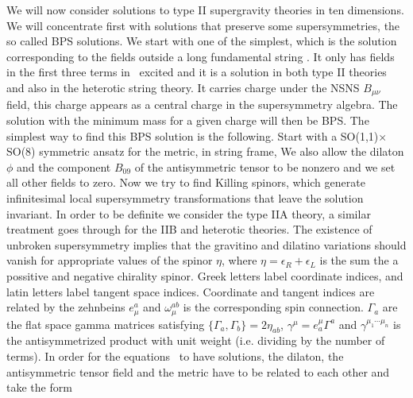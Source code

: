 We will now consider solutions to type II  supergravity 
theories in ten dimensions. We will concentrate first with 
solutions that preserve some supersymmetries, 
the so called BPS solutions.
We start with one of the simplest, which  is the
solution corresponding to the fields outside 
a long fundamental string \dh . 
It only has fields in the first three terms in \actiontwoa\ excited
and it is  a solution in both type II theories  and also in the 
 heterotic 
 string theory. 
It carries charge under the NSNS $B_{\mu\nu}$ field,
this charge
appears as a central charge in the supersymmetry algebra.
The solution with the minimum mass for a given charge
will then be BPS.
The simplest way to find this BPS solution is the following.
Start with a SO(1,1)$\times$SO(8) symmetric ansatz for the
metric, in string frame,
\eqn{}
We also allow the dilaton $\phi$ and the component $B_{09}$ of
the antisymmetric tensor to be nonzero and we set all 
other fields to zero. 
Now we try to find Killing spinors, 
which generate infinitesimal local  
supersymmetry
transformations that leave the solution invariant.
In order to be definite we consider the type IIA theory, 
a similar treatment goes through for the IIB and heterotic
theories.  The existence of unbroken supersymmetry 
implies that the gravitino and dilatino variations 
\eqn{}
should vanish for appropriate values of the spinor $\eta$, 
where $ \eta = \epsilon_R + \epsilon_L$ is the sum the 
a possitive and negative chirality spinor. 
Greek letters label coordinate indices, and latin letters
 label tangent space indices. Coordinate and tangent indices
are related by the zehnbeins $e^{a}_\mu$ and
$\omega_\mu^{ab} $ is the corresponding spin
connection.  $\Gamma_{a}$ are the flat space gamma matrices
satisfying $ \{ \Gamma_{a} , \Gamma_{ b} \} = 2
\eta_{ab}$, $ \gamma^{\mu } = e^\mu_{a}
\Gamma^{a} $ and $\gamma^{\mu_1\cdots \mu_n}$ is the
antisymmetrized product with unit weight (i.e. dividing by the number
of terms).
In order for the equations \susya\ to have solutions, the 
dilaton, the antisymmetric tensor field and the metric
have to be related to each other and take the form \dh
\eqn{}
